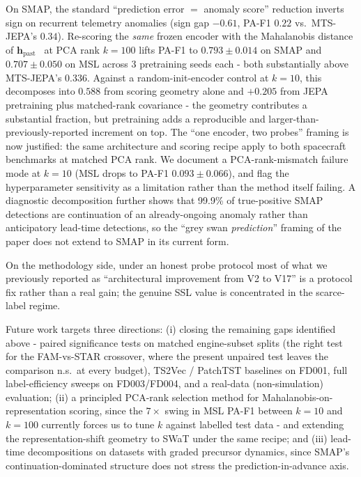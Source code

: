 \documentclass{article}
\newcommand{\h}{\mathbf{h}}
\begin{document}
On SMAP, the standard ``prediction error $=$ anomaly score'' reduction inverts sign on recurrent telemetry anomalies (sign gap $-0.61$, PA-F1 $0.22$ vs.\ MTS-JEPA's $0.34$). Re-scoring the \emph{same} frozen encoder with the Mahalanobis distance of $\h_\text{past}$~\citep{lee2018mahalanobis,sehwag2021ssd} at PCA rank $k=100$ lifts PA-F1 to $0.793 \pm 0.014$ on SMAP and $0.707 \pm 0.050$ on MSL across 3 pretraining seeds each - both substantially above MTS-JEPA's $0.336$. Against a random-init-encoder control at $k=10$, this decomposes into $0.588$ from scoring geometry alone and $+0.205$ from JEPA pretraining plus matched-rank covariance - the geometry contributes a substantial fraction, but pretraining adds a reproducible and larger-than-previously-reported increment on top. The ``one encoder, two probes'' framing is now justified: the same architecture and scoring recipe apply to both spacecraft benchmarks at matched PCA rank. We document a PCA-rank-mismatch failure mode at $k=10$ (MSL drops to PA-F1 $0.093 \pm 0.066$), and flag the hyperparameter sensitivity as a limitation rather than the method itself failing. A diagnostic decomposition further shows that 99.9\% of true-positive SMAP detections are continuation of an already-ongoing anomaly rather than anticipatory lead-time detections, so the ``grey swan \emph{prediction}'' framing of the paper does not extend to SMAP in its current form.

On the methodology side, under an honest probe protocol most of what we previously reported as ``architectural improvement from V2 to V17'' is a protocol fix rather than a real gain; the genuine SSL value is concentrated in the scarce-label regime.

Future work targets three directions: (i) closing the remaining gaps identified above - paired significance tests on matched engine-subset splits (the right test for the FAM-vs-STAR crossover, where the present unpaired test leaves the comparison n.s.\ at every budget), TS2Vec / PatchTST baselines on FD001, full label-efficiency sweeps on FD003/FD004, and a real-data (non-simulation) evaluation; (ii) a principled PCA-rank selection method for Mahalanobis-on-representation scoring, since the $7\times$ swing in MSL PA-F1 between $k=10$ and $k=100$ currently forces us to tune $k$ against labelled test data - and extending the representation-shift geometry to SWaT under the same recipe; and (iii) lead-time decompositions on datasets with graded precursor dynamics, since SMAP's continuation-dominated structure does not stress the prediction-in-advance axis.
\end{document}
